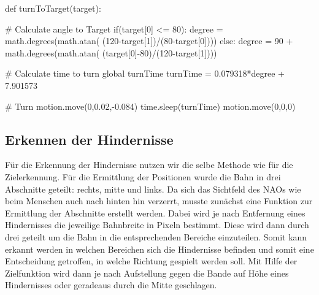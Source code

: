\documentclass{scrartcl}
\begin{document}
\begin{python}
def turnToTarget(target):

    # Calculate angle to Target
    if(target[0] <= 80):
        degree = math.degrees(math.atan(
        	(120-target[1])/(80-target[0])))
    else:
        degree = 90 + math.degrees(math.atan(
        (target[0]-80)/(120-target[1])))

    # Calculate time to turn
    global turnTime
    turnTime = 0.079318*degree + 7.901573

    # Turn
    motion.move(0,0.02,-0.084)
    time.sleep(turnTime)
    motion.move(0,0,0)
\end{python}
 
\subsection{Erkennen der Hindernisse}

Für die Erkennung der Hindernisse nutzen wir die selbe Methode wie für die Zielerkennung. Für die Ermittlung der Positionen wurde die Bahn in drei Abschnitte geteilt: rechts, mitte und links.  Da sich das Sichtfeld des NAOs wie beim Menschen auch nach hinten hin verzerrt, musste zunächst eine Funktion zur Ermittlung der Abschnitte erstellt werden. Dabei wird je nach Entfernung eines Hindernisses die jeweilige Bahnbreite in Pixeln bestimmt.
Diese wird dann durch drei geteilt um die Bahn in die entsprechenden Bereiche einzuteilen. Somit kann erkannt werden in welchen Bereichen sich die Hindernisse befinden und somit eine Entscheidung getroffen, in welche Richtung gespielt werden soll. Mit Hilfe der Zielfunktion wird dann je nach Aufstellung gegen die Bande auf Höhe eines Hindernisses oder geradeaus durch die Mitte geschlagen.
\end{document}
